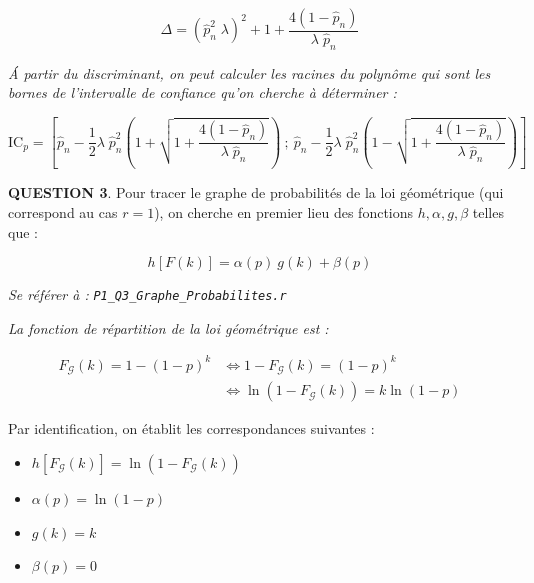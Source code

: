 \documentclass[a4paper,11pt]{article}
\newcommand{\quest}[1]{\small\textbf{#1}\normalsize}
\theoremstyle{nonumberplain}
\theoremstyle{nonumberplain}
\theoremstyle{nonumberplain}
\theoremstyle{nonumberplain}
\begin{document}
\begin{calculs}
        \[
            \Delta = (\hat{p}_n^2\;\lambda)^2 + 1 + \frac{4(1 - \hat{p}_n)}{\lambda\;\hat{p}_n}
        \]

        \emph{\'{A} partir du discriminant, on peut calculer les racines du polynôme qui sont
        les bornes de l'intervalle de confiance qu'on cherche à déterminer :}

        \[
            \text{IC}_{p} = \left[ \hat{p}_n - \frac{1}{2} \lambda\;\hat{p}_n^2 \left( 1 + \sqrt{1 + \frac{4(1 - \hat{p}_n)}{\lambda\;\hat{p}_n}} \right)\ ;
            \ \hat{p}_n - \frac{1}{2} \lambda\;\hat{p}_n^2 \left( 1 - \sqrt{1 + \frac{4(1 - \hat{p}_n)}{\lambda\;\hat{p}_n}} \right) \right]
        \]
    \end{calculs}

    \bigskip
    \bigskip
    \quest{QUESTION 3}. Pour tracer le graphe de probabilités de la loi
    géométrique (qui correspond au cas $r = 1$), on cherche en premier lieu des
    fonctions $h, \alpha, g, \beta$ telles que :

      \[
          h[F(k)] = \alpha(p)\ g(k) + \beta(p)
      \]

      \begin{ref_r}
          \emph{Se référer à :} \texttt{\emph{P1\_Q3\_Graphe\_Probabilites.r}}
      \end{ref_r}

      \vspace{-2ex}
      \begin{calculs}
          \emph{La fonction de répartition de la loi géométrique est :}

          \vspace{-2ex}
          \begin{equation*}
          \begin{split}
              F_\mathcal{G}(k) = 1 - (1 - p)^k & \iff 1 - F_\mathcal{G}(k) = (1 - p)^k \\
                                               & \iff \ln(1 - F_\mathcal{G}(k)) = k \ln(1 - p)
          \end{split}
          \end{equation*}
      \end{calculs}

        Par identification, on établit les correspondances suivantes :
        \medskip
        \begin{itemize}
            \item $h[F_\mathcal{G}(k)] = \ln(1 - F_\mathcal{G}(k))$
            \item $\alpha(p) = \ln(1 - p)$
            \item $g(k) = k$
            \item $\beta(p) = 0$
        \end{itemize}
\end{document}

